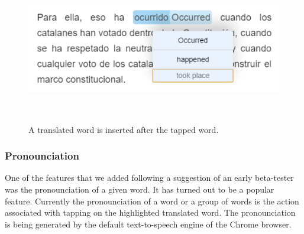 \begin{figure}[h!]
\centering
  \includegraphics[width=0.8\columnwidth]{figures/translation_alter_menu}
  \caption{A translated word is inserted after the tapped word.}~\label{fig:registrations}
\end{figure}

\subsubsection{Pronounciation}
One of the features that we added following a suggestion of an early beta-tester was the pronounciation of a given word. It has turned out to be a popular feature. Currently the pronounciation of a word or a group of words is the action associated with tapping on the highlighted translated word. The pronounciation is being generated by the default text-to-speech engine of the Chrome browser. 

